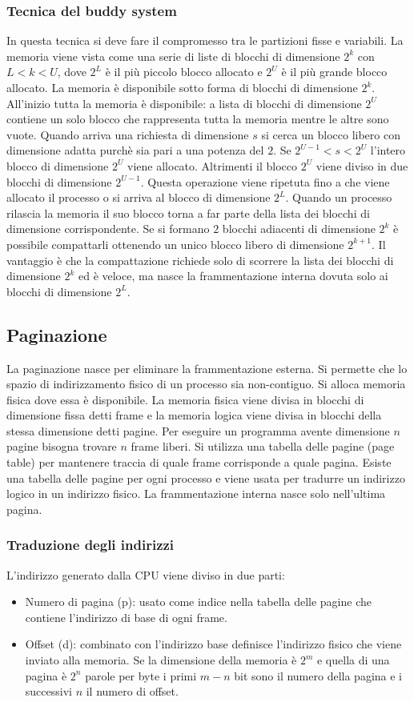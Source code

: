 \subsubsection{Tecnica del buddy system}
In questa tecnica si deve fare il compromesso tra le partizioni fisse e variabili. La memoria viene vista come una serie di liste di blocchi di dimensione $2^k$ con $L < k < U$, dove
$2^L$ \`e il pi\`u piccolo blocco allocato e $2^U$ \`e il pi\`u grande blocco allocato. La memoria \`e disponibile sotto forma di blocchi di dimensione $2^k$. All'inizio tutta la memoria
\`e disponibile: a lista di blocchi di dimensione $2^U$ contiene un solo blocco che rappresenta tutta la memoria mentre le altre sono vuote. Quando arriva una richiesta di dimensione $s$
si cerca un blocco libero con dimensione adatta purch\`e sia pari a una potenza del $2$. Se $2^{U-1} < s < 2^U$ l'intero blocco di dimensione $2^U$ viene allocato. Altrimenti il blocco 
$2^U$ viene diviso in due blocchi di dimensione $2^{U-1}$. Questa operazione viene ripetuta fino a che viene allocato il processo o si arriva al blocco di dimensione $2^L$. Quando
un processo rilascia la memoria il suo blocco torna a far parte della lista dei blocchi di dimensione corrispondente. Se si formano $2$ blocchi adiacenti di dimensione $2^k$ \`e 
possibile compattarli ottenendo un unico blocco libero di dimensione $2^{k+1}$. Il vantaggio \`e che la compattazione richiede solo di scorrere la lista dei blocchi di dimensione $2^k$
ed \`e veloce, ma nasce la frammentazione interna dovuta solo ai blocchi di dimensione $2^L$. 
\subsection{Paginazione}
La paginazione nasce per eliminare la frammentazione esterna. Si permette che lo spazio di indirizzamento fisico di un processo sia non-contiguo. Si alloca memoria fisica dove essa \`e
disponibile. La memoria fisica viene divisa in blocchi di dimensione fissa detti frame e la memoria logica viene divisa in blocchi della stessa dimensione detti pagine. Per eseguire
un programma avente dimensione $n$ pagine bisogna trovare $n$ frame liberi. Si utilizza una tabella delle pagine (page table) per mantenere traccia di quale frame corrisponde a quale
pagina. Esiste una tabella delle pagine per ogni processo e viene usata per tradurre un indirizzo logico in un indirizzo fisico. La frammentazione interna nasce solo nell'ultima pagina. 
\subsubsection{Traduzione degli indirizzi}
L'indirizzo generato dalla CPU viene diviso in due parti: 
\begin{itemize}
	\item Numero di pagina (p): usato come indice nella tabella delle pagine che contiene l'indirizzo di base di ogni frame. 
	\item Offset (d): combinato con l'indirizzo base definisce l'indirizzo fisico che viene inviato alla memoria. Se la dimensione della memoria \`e $2^m$ e quella di una pagina \`e
		$2^n$ parole per byte i primi $m-n$ bit sono il numero della pagina e i successivi $n$ il numero di offset. 
\end{itemize}
